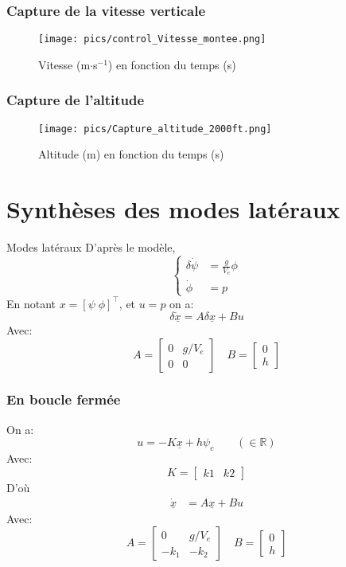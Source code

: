 \documentclass[tikz, footheight=2em]{beamer}
\begin{document}
\begin{frame}
	\frametitle{Capture de la vitesse verticale}
	\begin{figure}
		\center
		\texttt{[image: pics/control\_Vitesse\_montee.png]}
		\caption{Vitesse (m\(\cdot\)s\(^{-1}\)) en fonction du temps (s)}
	\end{figure}
\end{frame}

\begin{frame}
	\frametitle{Capture de l'altitude}
	\begin{figure}
		\center
		\texttt{[image: pics/Capture\_altitude\_2000ft.png]}
		\caption{Altitude (m) en fonction du temps (s)}
	\end{figure}
\end{frame}

\section{Synth\`eses des modes lat\'eraux}

\begin{frame}{Modes lat\'eraux}
    D'apr\`es le mod\`ele,
    \[
        \left\lbrace
        \begin{aligned}
            \delta \dot{\psi} &= \frac{g}{V_e}\phi \\
            \dot{\phi} &= p
        \end{aligned}
        \right.
    \] \pause{}
    En notant \(x = {[\psi \; \phi]}^\top \), et \( u = p \) on a:
    \[
    \delta \underline{\dot{x}} = A \delta \underline{x} + B u
    \] \pause{}
    Avec:
    \[
    A = \begin{bmatrix}
           0 & g/V_e\\
           0 & 0
       \end{bmatrix}
       \quad
       B = \begin{bmatrix}
           0 \\ h
       \end{bmatrix}
   \]
\end{frame}

\begin{frame}
    \frametitle{En boucle fermée} \pause{}
    On a:
    \[
    u = -K \underline{x} + h \psi_c \qquad (\in \mathbb{R})
    \] \pause{}
    Avec:
    \[
    K = \begin{bmatrix}
           k1 & k2
       \end{bmatrix}
   \] \pause{}
   D'où
   \[
       \begin{aligned}
           \dot{\underline{x}} &= A\underline{x} + Bu
       \end{aligned}
    \] \pause{}
    Avec:
    \[
       A = \begin{bmatrix}
           0 & g/V_e\\
           -k_1 & -k_2
       \end{bmatrix}
       \quad
       B = \begin{bmatrix}
           0 \\ h
       \end{bmatrix}
   \]
\end{frame}
\end{document}
